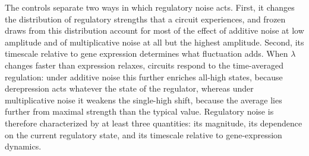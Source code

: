 \documentclass[11pt]{article}
\providecommand{\DIFaddtex}[1]{{\protect\color{red}#1}} %
\providecommand{\DIFdeltex}[1]{} %
\providecommand{\DIFaddbegin}{} %
\providecommand{\DIFaddend}{} %
\providecommand{\DIFdelbegin}{} %
\providecommand{\DIFdelend}{} %
\providecommand{\DIFadd}[1]{\texorpdfstring{\DIFaddtex{#1}}{#1}} %
\providecommand{\DIFdel}[1]{\texorpdfstring{\DIFdeltex{#1}}{}} %
\providecommand{\DIFaddincludegraphics}[2][]{\DIFOincludegraphics[#1]{#2}} %
\providecommand{\DIFdelincludegraphics}[2][]{}
\DeclareRobustCommand{\DIFaddbegin}{\DIFOaddbegin \let\includegraphics\DIFaddincludegraphics} %
\DeclareRobustCommand{\DIFaddend}{\DIFOaddend \let\includegraphics\DIFOincludegraphics} %
\DeclareRobustCommand{\DIFdelbegin}{\DIFOdelbegin \let\includegraphics\DIFdelincludegraphics} %
\DeclareRobustCommand{\DIFdelend}{\DIFOaddend \let\includegraphics\DIFOincludegraphics} %
\begin{document}
\DIFdelbegin \DIFdel{This timescale perspective also clarifies why the stochastic simulations cannot be reduced to parameter resampling. Deterministic simulations sampled from the noise-induced }\DIFdelend %
\DIFaddbegin \DIFadd{The controls separate two ways in which regulatory noise acts. First, it changes the distribution of regulatory strengths that a circuit experiences, and frozen draws from this distribution account for most of the effect of additive noise at low amplitude and of multiplicative noise at all but the highest amplitude. Second, its timescale relative to gene expression determines what fluctuation adds. When }\DIFaddend $\lambda$ \DIFdelbegin \DIFdel{distributions reproduced only part of the observed phenotype redistribution. Both additive and multiplicative noise produced state occupancies beyond those predicted by their stationary parameter distributions, demonstrating that the temporal ordering and persistence of regulatory statesmatter in addition to the values sampled}\DIFdelend \DIFaddbegin \DIFadd{changes faster than expression relaxes, circuits respond to the time-averaged regulation: under additive noise this further enriches all-high states, because derepression acts whatever the state of the regulator, whereas under multiplicative noise it weakens the single-high shift, because the average lies further from maximal strength than the typical value}\DIFaddend . Regulatory noise is therefore characterized by at least three quantities: its magnitude, its dependence on the current regulatory state, and its timescale relative to gene-expression dynamics.
\end{document}
